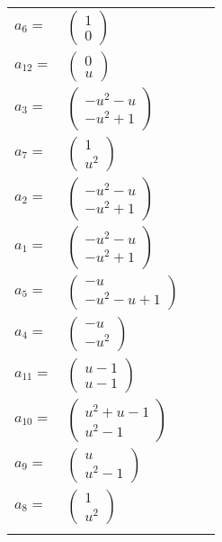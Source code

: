 \documentclass[1p]{elsarticle_modified}
\theoremstyle{definition}
\begin{document}
\begin{tabular}{m{7pt} m{180pt} m{7pt} m{180pt} }
\flushright $a_{6}=$&$\begin{pmatrix}1\\0\end{pmatrix}$ \\
\flushright $a_{12}=$&$\begin{pmatrix}0\\u\end{pmatrix}$ \\
\flushright $a_{3}=$&$\begin{pmatrix}- u^2- u\\- u^2+1\end{pmatrix}$ \\
\flushright $a_{7}=$&$\begin{pmatrix}1\\u^2\end{pmatrix}$ \\
\flushright $a_{2}=$&$\begin{pmatrix}- u^2- u\\- u^2+1\end{pmatrix}$ \\
\flushright $a_{1}=$&$\begin{pmatrix}- u^2- u\\- u^2+1\end{pmatrix}$ \\
\flushright $a_{5}=$&$\begin{pmatrix}- u\\- u^2- u+1\end{pmatrix}$ \\
\flushright $a_{4}=$&$\begin{pmatrix}- u\\- u^2\end{pmatrix}$ \\
\flushright $a_{11}=$&$\begin{pmatrix}u-1\\u-1\end{pmatrix}$ \\
\flushright $a_{10}=$&$\begin{pmatrix}u^2+u-1\\u^2-1\end{pmatrix}$ \\
\flushright $a_{9}=$&$\begin{pmatrix}u\\u^2-1\end{pmatrix}$ \\
\flushright $a_{8}=$&$\begin{pmatrix}1\\u^2\end{pmatrix}$\\&\end{tabular}
\end{document}
